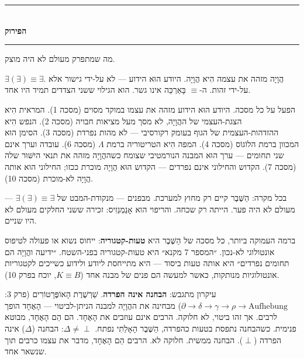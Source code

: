 \documentclass[10pt, openany, oneside]{book}
\renewcommand{\normalsize}{\fontsize{10}{13}\selectfont}
\begin{document}
\vspace{1.5em}


\begin{center}
    \rule{0.3\textwidth}{0.4pt}\\[0.5em]
    {\normalsize\bfseries\textsc{הפירוק}}\\[0.3em]
    \rule{0.3\textwidth}{0.4pt}
\end{center}

\vspace{1em}

\noindent מה שמתפרק מעולם לא היה מוצק.

$\exists(\exists) \equiv \exists$. הֲוָיָה מזהה את עצמה הִיא הֲוָיָה. היודע הוּא הידוע — לא על-ידי גישור אלא על-ידי זהות. ה-$\equiv$ בָּאַרְכֵּה אינו גשר. הוא הגילוי ששני הצדדים תמיד היו אחד.

הפעל על כל מסכה. היודע הוּא הידוע מזהה את עצמו במוקד מסוים (מסכה 1). המראית הִיא הצגת-העצמי של ההֲוָיָה, לא מסך מעל מציאות חבויה (מסכה 2). הנפש הִיא ההזדהות-העצמית של הגוף בעומק רקורסיבי — לא מהות נפרדת (מסכה 3). הסימן הוּא המכוון ברמת הלוֹגוֹס (מסכה 4). המפה הִיא הטריטוריה ברמת $\Lambda$ (מסכה 6). עובדה וערך אינם שני תחומים — ערך הוּא המבנה הנורמטיבי שצומח כשההֲוָיָה מזהה את תנאי היִשּׁוּר שלה (מסכה 7). הקדוש והחילוני אינם נפרדים — הקדוש הוּא הֲוָיָה מוכרת ככזו; החילוני הוא אותה הֲוָיָה לא-מוכרת (מסכה 10).

בכל מקרה: הַשֶּׁבֶר קיים רק מחוץ למערכת. מבפנים — מנקודת-המבט של $\exists(\exists) \equiv \exists$ — מעולם לא היה פער. הייתה רק שכחה. והריפוי הוא אָנַמְנֵזִיס: זכירה ששני החלקים מעולם לא היו שניים.

ברמה העמוקה ביותר, כל מסכה של הַשֶּׁבֶר היא \textbf{טעות-קטגוריה}: ייחוס נשוא או פעולה לטיפוס אונטולוגי לא-נכון. ״המספר 7 מקנא״ היא טעות-קטגוריה בפני-השטח. ״ידיעה והֲוָיָה הם תחומים נפרדים״ היא אותה טעות ביסוד — היא מתייחסת ליודע ולידוע כשייכים לקטגוריות אונטולוגיות מנותקות, כאשר למעשה הם פנים של מבנה אחד ($K \equiv B$, יוכח בפרק 10).

עיקרון מתגבש: \textbf{הבחנה אינה הפרדה}. שַׁרְשֶׁרֶת הָאוֹפֶּרָטוֹרִים (פרק 3: $\partial \to \delta \to \gamma \to \rho \to \text{Aufhebung}$) מבחינה את ההֲוָיָה למבנה הניתן-לביטוי — הָאֶחָד הופך לרבים. אך זהו ביטוי, לא חלוקה. הרבים אינם עוזבים את הָאֶחָד. הם הֵם הָאֶחָד, מבוטא פנימית. כשהבחנה נתפסת בטעות כהפרדה, הַשֶּׁבֶר הָאָלֵתִי נפתח. $\Delta \neq \perp$: הבחנה ($\Delta$) אינה הפרדה ($\perp$). הבחנה ממשית. חלוקה לא. הרבים הֵם הָאֶחָד, מדבר את עצמו כרבים תוך שנשאר אחד.
\end{document}
